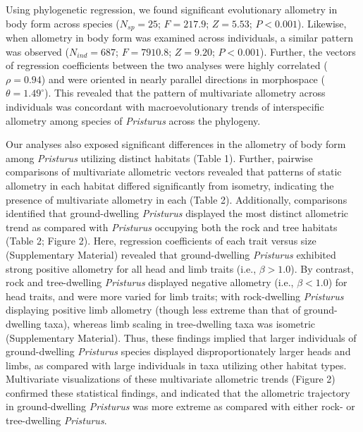 \documentclass[
  11pt,
]{article}
\begin{document}
Using phylogenetic regression, we found significant evolutionary
allometry in body form across species (\(N_{sp}=25\); \(F = 217.9\);
\(Z =5.53\); \(P < 0.001\)). Likewise, when allometry in body form was
examined across individuals, a similar pattern was observed
(\(N_{ind}=687\); \(F = 7910.8\); \(Z =9.20\); \(P < 0.001\)). Further,
the vectors of regression coefficients between the two analyses were
highly correlated (\(\rho = 0.94\)) and were oriented in nearly parallel
directions in morphospace (\(\theta = 1.49^\circ\)). This revealed that
the pattern of multivariate allometry across individuals was concordant
with macroevolutionary trends of interspecific allometry among species
of \emph{Pristurus} across the phylogeny. \hfill\break

Our analyses also exposed significant differences in the allometry of
body form among \emph{Pristurus} utilizing distinct habitats (Table 1).
Further, pairwise comparisons of multivariate allometric vectors
revealed that patterns of static allometry in each habitat differed
significantly from isometry, indicating the presence of multivariate
allometry in each (Table 2). Additionally, comparisons identified that
ground-dwelling \emph{Pristurus} displayed the most distinct allometric
trend as compared with \emph{Pristurus} occupying both the rock and tree
habitats (Table 2; Figure 2). Here, regression coefficients of each
trait versus size (Supplementary Material) revealed that ground-dwelling
\emph{Pristurus} exhibited strong positive allometry for all head and
limb traits (i.e., \(\beta>1.0\)). By contrast, rock and tree-dwelling
\emph{Pristurus} displayed negative allometry (i.e., \(\beta < 1.0\))
for head traits, and were more varied for limb traits; with
rock-dwelling \emph{Pristurus} displaying positive limb allometry
(though less extreme than that of ground-dwelling taxa), whereas limb
scaling in tree-dwelling taxa was isometric (Supplementary Material).
Thus, these findings implied that larger individuals of ground-dwelling
\emph{Pristurus} species displayed disproportionately larger heads and
limbs, as compared with large individuals in taxa utilizing other
habitat types. Multivariate visualizations of these multivariate
allometric trends (Figure 2) confirmed these statistical findings, and
indicated that the allometric trajectory in ground-dwelling
\emph{Pristurus} was more extreme as compared with either rock- or
tree-dwelling \emph{Pristurus}. \hfill\break
\end{document}
